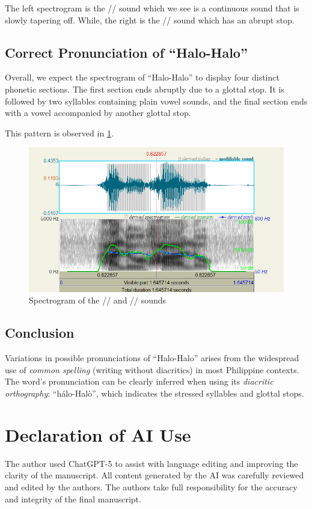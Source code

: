 \documentclass{article}
\begin{document}
The left spectrogram is the // sound which we see is a continuous
sound that is slowly tapering off. While, the right is the // sound
which has an abrupt stop.

\subsection{Correct Pronunciation of ``Halo-Halo''}
Overall, we expect the spectrogram of ``Halo-Halo'' to display four distinct
phonetic sections. The first section ends abruptly due to a glottal stop. It is
followed by two syllables containing plain vowel sounds, and the final section
ends with a vowel accompanied by another glottal stop.

This pattern is observed in \cref{fig:correct}.

\begin{figure}
    \centering
    \includegraphics[width=0.65\linewidth]{img/correct.png}
    \caption{Spectrogram of the // and // sounds}\label{fig:correct}
\end{figure}

\subsection{Conclusion}

Variations in possible pronunciations of ``Halo-Halo'' arises from the
widespread use of \emph{common spelling} (writing without diacritics) in most
Philippine contexts. The word's pronunciation can be clearly inferred when
using its \emph{diacritic orthography}: ``h\'alo-Hal\`o'', which indicates the
stressed syllables and glottal stops.




\section*{Declaration of AI Use}
The author used ChatGPT-5 to assist with language editing and improving the clarity of the manuscript. All content 
generated by the AI was carefully reviewed and edited by the authors. The authors take full responsibility for the 
accuracy and integrity of the final manuscript.
\end{document}
